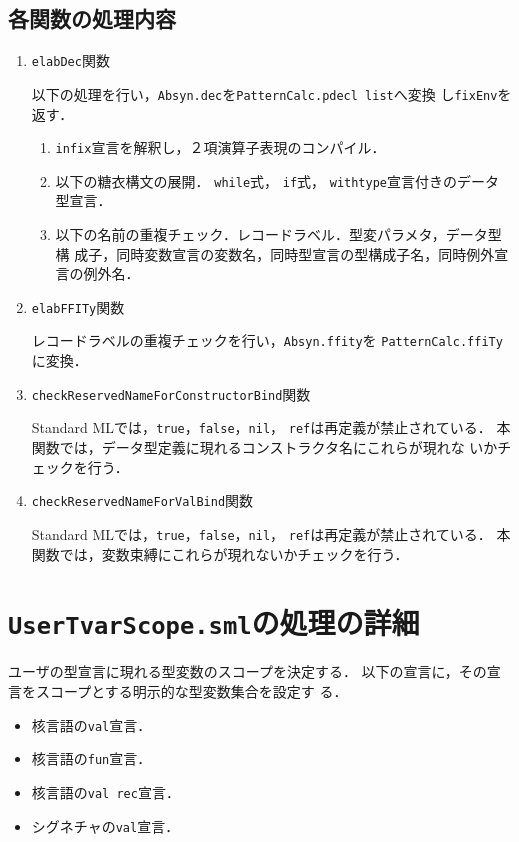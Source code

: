 \documentclass{jbook}
\newif\ifjp
\newcommand{\txt}[2]{#1}
\newcommand{\code}[1]{\mbox{\large\tt #1}}
\begin{document}
\subsection{各関数の処理内容}
\begin{enumerate}
\item \code{elabDec}関数

以下の処理を行い，\code{Absyn.dec}を\code{PatternCalc.pdecl list}へ変換
し\code{fixEnv}を返す．
\begin{enumerate}
\item \code{infix}宣言を解釈し，２項演算子表現のコンパイル．
\item 以下の糖衣構文の展開．
\code{while}式，
\code{if}式，
\code{withtype}宣言付きのデータ型宣言．
\item 以下の名前の重複チェック．レコードラベル．型変パラメタ，データ型構
成子，同時変数宣言の変数名，同時型宣言の型構成子名，同時例外宣言の例外名．
\end{enumerate}
	
\item \code{elabFFITy}関数

レコードラベルの重複チェックを行い，\code{Absyn.ffity}を
\code{PatternCalc.ffiTy}に変換．

\item \code{checkReservedNameForConstructorBind}関数

	Standard MLでは，\code{true}，\code{false}，\code{nil}，
\code{ref}は再定義が禁止されている．
	本関数では，データ型定義に現れるコンストラクタ名にこれらが現れな
いかチェックを行う．
\item \code{checkReservedNameForValBind}関数

	Standard MLでは，\code{true}，\code{false}，\code{nil}，
\code{ref}は再定義が禁止されている．
	本関数では，変数束縛にこれらが現れないかチェックを行う．
\end{enumerate}

\else%
\fi%

\section{\txt{\code{UserTvarScope.sml}の処理の詳細}{The details of \code{UserTvarScope.sml}}}
\ifjp%
	ユーザの型宣言に現れる型変数のスコープを決定する．
	以下の宣言に，その宣言をスコープとする明示的な型変数集合を設定す
る．
\begin{itemize}
\item 核言語の\code{val}宣言．
\item 核言語の\code{fun}宣言．
\item 核言語の\code{val rec}宣言．
\item シグネチャの\code{val}宣言．
\end{itemize}
\end{document}
